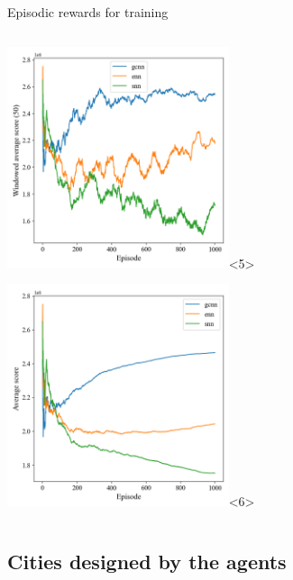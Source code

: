 \documentclass[english, aspectratio=169]{beamer}
\begin{document}
\begin{frame}{Episodic rewards for training}
\begin{columns}
\begin{column}{0.5\textwidth}
\begin{center}
\begin{scriptsize}
	\includegraphics[width=6.5cm, keepaspectratio]{images/windowed_scores_comparison_test_5_intersection_empty}<5>	
	
	\includegraphics[width=6.5cm, keepaspectratio]{images/average_scores_comparison_test_5_intersection_empty}<6>				
			
	\end{scriptsize}
	
	\end{center}

\end{column}

\end{columns}
\end{frame}

\subsection{Cities designed by the agents}
\end{document}
